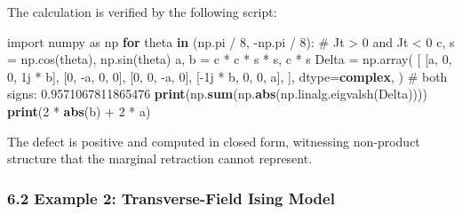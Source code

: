 \documentclass[
  11pt,
]{article}
\newenvironment{Shaded}{\begin{snugshade}}{\end{snugshade}}
\newcommand{\BuiltInTok}[1]{\textcolor[rgb]{0.39,0.29,0.61}{\textbf{#1}}}
\newcommand{\CommentTok}[1]{\textcolor[rgb]{0.54,0.53,0.53}{#1}}
\newcommand{\ControlFlowTok}[1]{\textcolor[rgb]{0.12,0.11,0.11}{\textbf{#1}}}
\newcommand{\DecValTok}[1]{\textcolor[rgb]{0.69,0.50,0.00}{#1}}
\newcommand{\ImportTok}[1]{\textcolor[rgb]{1.00,0.33,0.00}{#1}}
\newcommand{\KeywordTok}[1]{\textcolor[rgb]{0.12,0.11,0.11}{\textbf{#1}}}
\newcommand{\NormalTok}[1]{\textcolor[rgb]{0.12,0.11,0.11}{#1}}
\newcommand{\OperatorTok}[1]{\textcolor[rgb]{0.12,0.11,0.11}{#1}}
\newcommand{\OtherTok}[1]{\textcolor[rgb]{0.00,0.43,0.16}{#1}}
\begin{document}
The calculation is verified by the following script:

\begin{Shaded}
\begin{Highlighting}[]
\ImportTok{import}\NormalTok{ numpy }\ImportTok{as}\NormalTok{ np}
\ControlFlowTok{for}\NormalTok{ theta }\KeywordTok{in}\NormalTok{ (np.pi }\OperatorTok{/} \DecValTok{8}\NormalTok{, }\OperatorTok{{-}}\NormalTok{np.pi }\OperatorTok{/} \DecValTok{8}\NormalTok{):  }\CommentTok{\# Jt \textgreater{} 0 and Jt \textless{} 0}
\NormalTok{    c, s }\OperatorTok{=}\NormalTok{ np.cos(theta), np.sin(theta)}
\NormalTok{    a, b }\OperatorTok{=}\NormalTok{ c }\OperatorTok{*}\NormalTok{ c }\OperatorTok{*}\NormalTok{ s }\OperatorTok{*}\NormalTok{ s, c }\OperatorTok{*}\NormalTok{ s}
\NormalTok{    Delta }\OperatorTok{=}\NormalTok{ np.array(}
\NormalTok{        [}
\NormalTok{            [a, }\DecValTok{0}\NormalTok{, }\DecValTok{0}\NormalTok{, }\OtherTok{1j} \OperatorTok{*}\NormalTok{ b],}
\NormalTok{            [}\DecValTok{0}\NormalTok{, }\OperatorTok{{-}}\NormalTok{a, }\DecValTok{0}\NormalTok{, }\DecValTok{0}\NormalTok{],}
\NormalTok{            [}\DecValTok{0}\NormalTok{, }\DecValTok{0}\NormalTok{, }\OperatorTok{{-}}\NormalTok{a, }\DecValTok{0}\NormalTok{],}
\NormalTok{            [}\OperatorTok{{-}}\OtherTok{1j} \OperatorTok{*}\NormalTok{ b, }\DecValTok{0}\NormalTok{, }\DecValTok{0}\NormalTok{, a],}
\NormalTok{        ],}
\NormalTok{        dtype}\OperatorTok{=}\BuiltInTok{complex}\NormalTok{,}
\NormalTok{    )}
    \CommentTok{\# both signs: 0.9571067811865476}
    \BuiltInTok{print}\NormalTok{(np.}\BuiltInTok{sum}\NormalTok{(np.}\BuiltInTok{abs}\NormalTok{(np.linalg.eigvalsh(Delta))))}
    \BuiltInTok{print}\NormalTok{(}\DecValTok{2} \OperatorTok{*} \BuiltInTok{abs}\NormalTok{(b) }\OperatorTok{+} \DecValTok{2} \OperatorTok{*}\NormalTok{ a)}
\end{Highlighting}
\end{Shaded}

The defect is positive and computed in closed form, witnessing non-product structure that the marginal retraction cannot represent.

\subsubsection{6.2 Example 2: Transverse-Field Ising Model}\label{example-2-transverse-field-ising-model}
\end{document}
